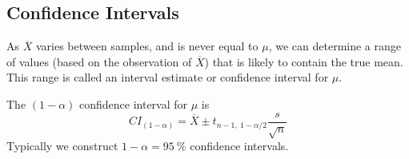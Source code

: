 \documentclass{article}
\begin{document}
\subsection{Confidence Intervals}
\begin{definition}
    As \(\overline{X}\) varies between samples, and is never equal to \(\mu\), we can determine
    a range of values (based on the observation of \(\overline{X}\)) that is likely to contain
    the true mean. This range is called an interval estimate or confidence interval for \(\mu \).

    The \(\left( 1 - \alpha \right)\) confidence interval for \(\mu \) is
    \begin{equation*}
        {CI}_{\left( 1 - \alpha \right)} = \overline{X} \pm t_{n-1,\: 1-\alpha/2} \frac{s}{\sqrt{n}}
    \end{equation*}
    Typically we construct \(1-\alpha = \qty{95}{\%}\) confidence intervals.
\end{definition}
\end{document}
